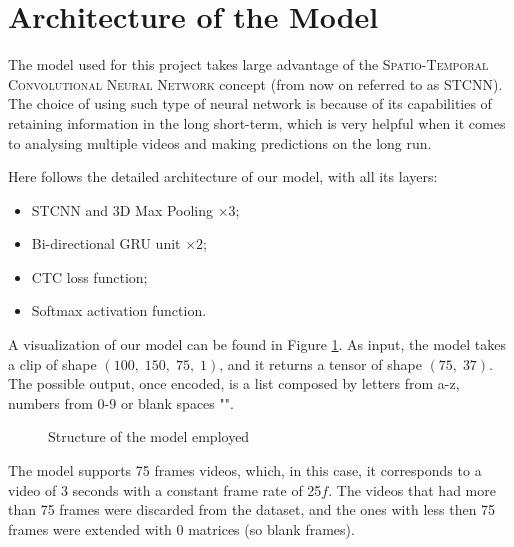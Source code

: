 \documentclass[11pt,journal]{IEEEtran}
\newcommand{\nl}{

\medskip

}
\begin{document}
\section{Architecture of the Model}

The model used for this project takes large advantage of the \textsc{Spatio-Temporal Convolutional Neural Network} concept \cite{gunileo:stcnn} (from now on referred to as STCNN). The choice of using such type of neural network is because of its capabilities of retaining information in the long short-term, which is very helpful when it comes to analysing multiple videos and making predictions on the long run.
\nl
Here follows the detailed architecture of our model, with all its layers:
\begin{itemize}
    \item STCNN and 3D Max Pooling $\times 3$;
    \item Bi-directional GRU unit $\times 2$;
    \item CTC loss function;
    \item Softmax activation function.
\end{itemize}

A visualization of our model can be found in Figure \ref{model_struct}. As input, the model takes a clip of shape $(100, \; 150, \; 75, \; 1)$, and it returns a tensor of shape $(75, \; 37)$. The possible output, once encoded, is a list composed by letters from a-z, numbers from 0-9 or blank spaces "\textvisiblespace".

\begin{figure}
    \renewcommand{\arraystretch}{1.3}
    \caption{Structure of the model employed}
    \label{model_struct}
\end{figure}

\nl
The model supports 75 frames videos, which, in this case, it corresponds to a video of 3 seconds with a constant frame rate of 25$f$. The videos that had more than 75 frames were discarded from the dataset, and the ones with less then 75 frames were extended with 0 matrices (so blank frames).
\end{document}

